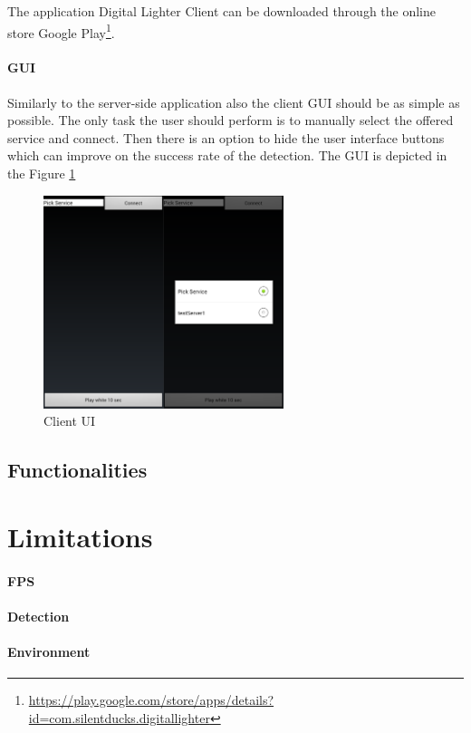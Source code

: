 The application Digital Lighter Client can be downloaded through the online store Google Play\footnote{\url{https://play.google.com/store/apps/details?id=com.silentducks.digitallighter}}.

\paragraph{GUI}
Similarly to the server-side application also the client GUI should be as simple as possible. The only task the user should perform is to manually select the offered service and connect. Then there is an option to hide the user interface buttons which can improve on the success rate of the detection. The GUI is depicted in the Figure \ref{fig:Client_UI}

\begin{figure}[H]
	\centering
		\includegraphics[width=7cm]{conclusion/user_ui.png}
	\caption{Client UI}
	\label{fig:Client_UI}
\end{figure}

\subsection{Functionalities}


\section{Limitations}


\paragraph{FPS}

\paragraph{Detection}

\paragraph{Environment}

